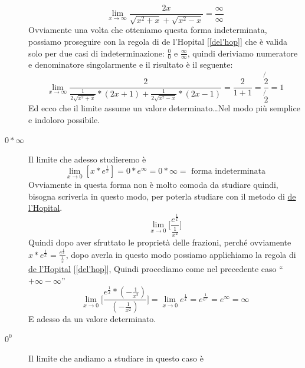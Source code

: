 \begin{description}
		\begin{equation*}
			\lim_{x\to\infty}\frac{2x}{\sqrt{x^2+x}+\sqrt{x^2-x}}=\frac{\infty}{\infty}
		\end{equation*}
		Ovviamente una volta che otteniamo questa forma indeterminata, possiamo proseguire con la regola di de l’Hopital [\ref{del'hop}] che è valida solo per due casi di indeterminazione: $\frac{0}{0}$ e $\frac{\infty}{\infty}$, quindi deriviamo numeratore e denominatore singolarmente e il risultato è il seguente:
		\begin{equation*}
			\lim_{x\to \infty}\frac{2}{\frac{1}{2\sqrt{x^2+x}}*(2x+1)+\frac{1}{2\sqrt{x^2-x}}*(2x-1)}=\frac{2}{1+1}=\frac{\not{2}}{\not{2}}=1
		\end{equation*}
		Ed ecco che il limite assume un valore determinato\dots Nel modo più semplice e indoloro possibile.
	\item [$0*\infty$ ] Il limite che adesso studieremo è
		\begin{equation*}
			\lim_{x\to 0}[x*e^\frac{1}{x}]=0*e^\infty=0*\infty=\text{ forma indeterminata}
		\end{equation*}
		Ovviamente in questa forma non è molto comoda da studiare quindi, bisogna scriverla in questo modo, per poterla studiare con il metodo di \underline{de l'Hopital}.
		\begin{equation*}
			\lim_{x\to 0}\bigg[\frac{e^\frac{1}{x}}{\frac{1}{x^2}}\bigg]
		\end{equation*}
		Quindi dopo aver sfruttato le proprietà delle frazioni, perché ovviamente $x*e^\frac{1}{x}=\frac{e^\frac{1}{x}}{\frac{1}{x}}$, dopo averla in questo modo possiamo applichiamo la regola di  \underline{de l'Hopital} [\ref{del'hop}], Quindi procediamo come nel precedente caso ``$+\infty-\infty$''
		\begin{equation*}
			\lim_{x\to 0}\bigg[\frac{e^\frac{1}{x}*(-\frac{1}{x^2})}{(-\frac{1}{x^2})}\bigg]=\lim_{x\to 0}e^\frac{1}{x}=e^\frac{1}{0^+}=e^\infty=\infty
		\end{equation*}
		E adesso da un valore determinato.
	\item [$0^0$ ] Il limite che andiamo a studiare in questo caso è
		

\end{description}
